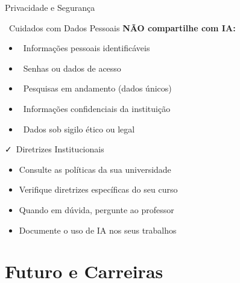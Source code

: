 \documentclass[aspectratio=169,12pt]{beamer}
\begin{document}
\begin{frame}{Privacidade e Segurança}
    \begin{alertblock}{\faUserShield\, Cuidados com Dados Pessoais}
        \textbf{NÃO compartilhe com IA:}
        \begin{itemize}
            \item \faIdCard\, Informações pessoais identificáveis
            \item \faKey\, Senhas ou dados de acesso
            \item \faFile\, Pesquisas em andamento (dados únicos)
            \item \faUniversity\, Informações confidenciais da instituição
            \item \faGavel\, Dados sob sigilo ético ou legal
        \end{itemize}
    \end{alertblock}
    
    \begin{block}{\faCheck\, Diretrizes Institucionais}
        \begin{itemize}
            \item Consulte as políticas da sua universidade
            \item Verifique diretrizes específicas do seu curso
            \item Quando em dúvida, pergunte ao professor
            \item Documente o uso de IA nos seus trabalhos
        \end{itemize}
    \end{block}
\end{frame}


\section{Futuro e Carreiras}
\end{document}

